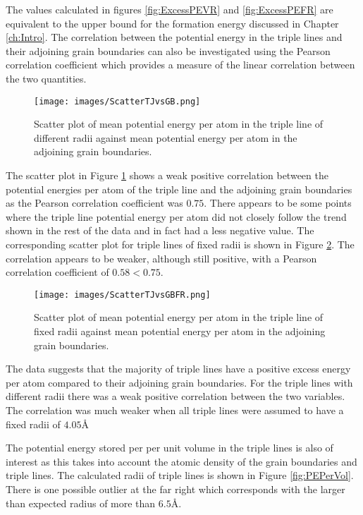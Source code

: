 \documentclass[12pt,a4paper,openany]{report}
\begin{document}
The values calculated in figures \ref{fig:ExcessPEVR} and \ref{fig:ExcessPEFR} are equivalent to the upper bound for the formation energy discussed in Chapter \ref{ch:Intro}. The correlation between the potential energy in the triple lines and their adjoining grain boundaries can also be investigated using the Pearson correlation coefficient which provides a measure of the linear correlation between the two quantities.

\begin{figure}[H]
	\texttt{[image: images/ScatterTJvsGB.png]} 
	\caption{Scatter plot of mean potential energy per atom in the triple line of different radii against mean potential energy per atom in the adjoining grain boundaries.}
	\label{fig:ScatterTJvsGB}
\end{figure}

The scatter plot in Figure \ref{fig:ScatterTJvsGB} shows a weak positive correlation between the potential energies per atom of the triple line and the adjoining grain boundaries as the Pearson correlation coefficient was $0.75$. There appears to be some points where the triple line potential energy per atom did not closely follow the trend shown in the rest of the data and in fact had a less negative value. 
\newpage
The corresponding scatter plot for triple lines of fixed radii is shown in Figure \ref{fig:ScatterTJvsGBFR}. The correlation appears to be weaker, although still positive, with a Pearson correlation coefficient of $0.58 < 0.75$. 

\begin{figure}[H]
	\texttt{[image: images/ScatterTJvsGBFR.png]} 
	\caption{Scatter plot of mean potential energy per atom in the triple line of fixed radii against mean potential energy per atom in the adjoining grain boundaries.}
	\label{fig:ScatterTJvsGBFR}
\end{figure}

The data suggests that the majority of triple lines have a positive excess energy per atom compared to their adjoining grain boundaries. For the triple lines with different radii there was a weak positive correlation between the two variables. The correlation was much weaker when all triple lines were assumed to have a fixed radii of $4.05 \textrm{\AA}$ 

\newpage
The potential energy stored per per unit volume in the triple lines is also of interest as this takes into account the atomic density of the grain boundaries and triple lines. The calculated radii of triple lines is shown in Figure \ref{fig:PEPerVol}. There is one possible outlier at the far right which corresponds with the larger than expected radius of more than $6.5 \textrm{\AA}$. 
\end{document}
